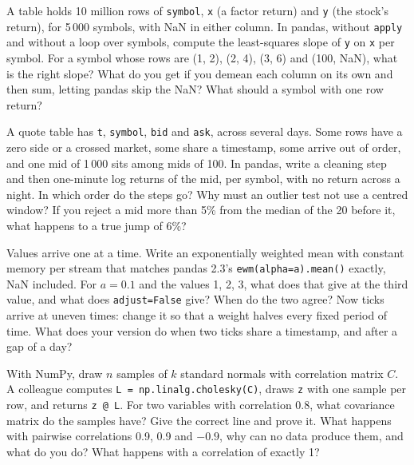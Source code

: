 \begin{question}\label{iq:iv3:python-and-pandas:30}
A table holds 10 million rows of \texttt{symbol}, \texttt{x} (a factor return) and \texttt{y} (the stock's return), for 5\,000 symbols, with NaN in either column. In pandas, without \texttt{apply} and without a loop over symbols, compute the least-squares slope of \texttt{y} on \texttt{x} per symbol. For a symbol whose rows are (1, 2), (2, 4), (3, 6) and (100, NaN), what is the right slope? What do you get if you demean each column on its own and then sum, letting pandas skip the NaN? What should a symbol with one row return?
\end{question}

\begin{question}\label{iq:iv3:python-and-pandas:31}
A quote table has \texttt{t}, \texttt{symbol}, \texttt{bid} and \texttt{ask}, across several days. Some rows have a zero side or a crossed market, some share a timestamp, some arrive out of order, and one mid of 1\,000 sits among mids of 100. In pandas, write a cleaning step and then one-minute log returns of the mid, per symbol, with no return across a night. In which order do the steps go? Why must an outlier test not use a centred window? If you reject a mid more than 5\% from the median of the 20 before it, what happens to a true jump of 6\%?
\end{question}

\begin{question}\label{iq:iv3:python-and-pandas:32}
Values arrive one at a time. Write an exponentially weighted mean with constant memory per stream that matches pandas 2.3's \texttt{ewm(alpha=a).mean()} exactly, NaN included. For $a = 0.1$ and the values 1, 2, 3, what does that give at the third value, and what does \texttt{adjust=False} give? When do the two agree? Now ticks arrive at uneven times: change it so that a weight halves every fixed period of time. What does your version do when two ticks share a timestamp, and after a gap of a day?
\end{question}

\begin{question}\label{iq:iv3:python-and-pandas:33}
With NumPy, draw $n$ samples of $k$ standard normals with correlation matrix $C$. A colleague computes \texttt{L = np.linalg.cholesky(C)}, draws \texttt{z} with one sample per row, and returns \texttt{z @ L}. For two variables with correlation 0.8, what covariance matrix do the samples have? Give the correct line and prove it. What happens with pairwise correlations 0.9, 0.9 and $-0.9$, why can no data produce them, and what do you do? What happens with a correlation of exactly 1?
\end{question}

